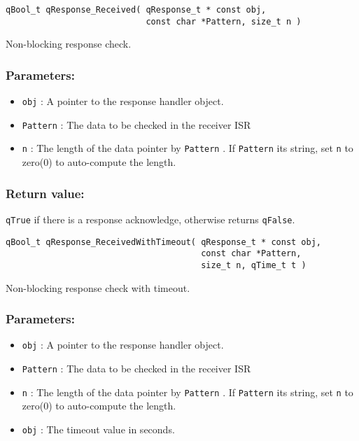 \noindent\hrulefill

\begin{lstlisting}[style=CStyle]
qBool_t qResponse_Received( qResponse_t * const obj, 
                            const char *Pattern, size_t n )
\end{lstlisting}

Non-blocking response check. 

\subsubsection*{Parameters:}
\begin{itemize}
    \item \lstinline{obj} : A pointer to the response handler object.
    \item \lstinline{Pattern} : The data to be checked in the receiver ISR
    \item \lstinline{n} : The length of the data pointer by \lstinline{Pattern} . If \lstinline{Pattern} its string, set \lstinline{n} to zero(0) to auto-compute the length.
\end{itemize}

\subsubsection*{Return value:}
\lstinline{qTrue} if there is a response acknowledge, otherwise returns \lstinline{qFalse}.

\noindent\hrulefill

\begin{lstlisting}[style=CStyle]
qBool_t qResponse_ReceivedWithTimeout( qResponse_t * const obj, 
                                       const char *Pattern, 
                                       size_t n, qTime_t t )
\end{lstlisting}

Non-blocking response check with timeout. 

\subsubsection*{Parameters:}
\begin{itemize}
    \item \lstinline{obj} : A pointer to the response handler object.
    \item \lstinline{Pattern} : The data to be checked in the receiver ISR
    \item \lstinline{n} : The length of the data pointer by \lstinline{Pattern} . If \lstinline{Pattern} its string, set \lstinline{n} to zero(0) to auto-compute the length.
    \item \lstinline{obj} : The timeout value in seconds.
\end{itemize}

